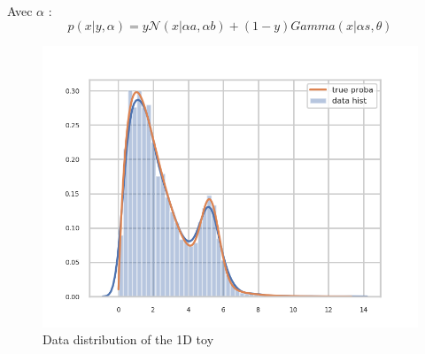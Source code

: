 Avec $\alpha$ :
$$
    p(x | y, \alpha) = y \mathcal N(x|\alpha a, \alpha b) + (1-y) Gamma(x|\alpha s, \theta)
$$

\begin{figure}[htb]
    \includegraphics[width=\linewidth]{minitoy/distrib.png}
    \caption{Data distribution of the 1D toy}
    \label{fig:minitoy_distrib}
\end{figure}




